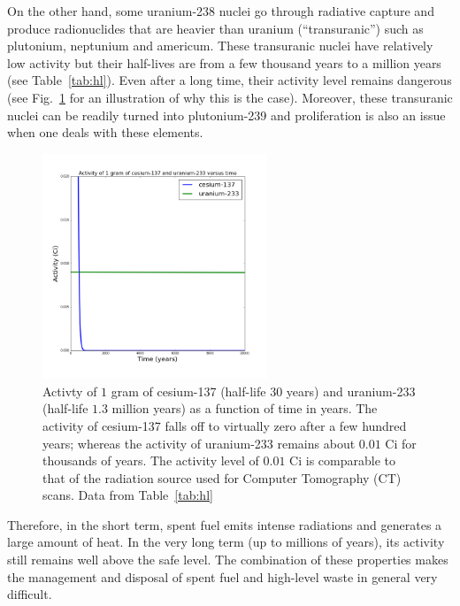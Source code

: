 \documentclass[nofootinbib,preprint,aps]{revtex4-1}
\begin{document}
        On the other hand, some uranium-238 nuclei go through radiative capture
        and produce radionuclides that are
        heavier than uranium (``transuranic'') such as plutonium, neptunium and americum.
        These transuranic nuclei have relatively low activity but their half-lives are from a few thousand years
        to a million years (see Table~\ref{tab:hl}).
        Even after a long time, their activity level remains dangerous (see Fig.~\ref{fig:csru} for
        an illustration of why this is the case).
        Moreover, these transuranic nuclei can be readily turned into plutonium-239 and proliferation is also
        an issue when one deals with these elements.
        \begin{figure}[h]
            \centering
            \includegraphics[width=0.6\textwidth]{csur.png}
            \caption{Activty of $1$ gram of cesium-137 (half-life $30$ years) and uranium-233 (half-life $1.3$ million
            years) as a function of time in years. The activity of cesium-137 falls off to virtually zero after a few
        hundred years; whereas the activity of uranium-233 remains about $0.01$ Ci for thousands of years. The activity
    level of $0.01$ Ci is comparable to that of the radiation source used for Computer Tomography (CT) scans.
Data from Table~\ref{tab:hl}}
            \label{fig:csru}
        \end{figure}
        Therefore, in the short term, spent fuel emits intense radiations and generates a large amount of heat.
        In the very long term (up to millions of years), its activity still remains well above the safe level.
        The combination of these properties makes the management and disposal of spent fuel and high-level waste
        in general very difficult.
\end{document}
